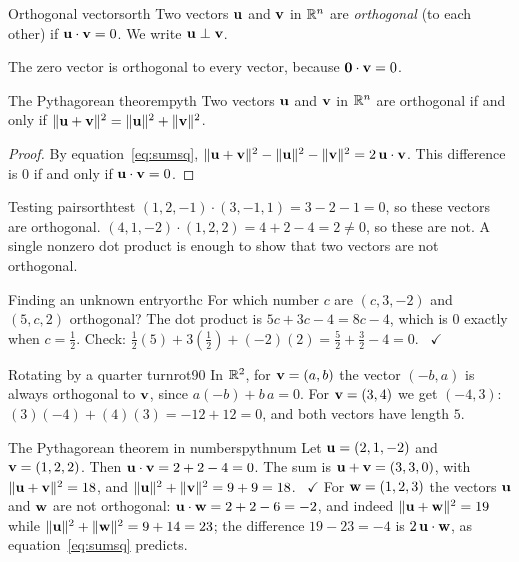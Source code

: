 \documentclass[11pt]{article}
\begin{document}
\begin{defn}{Orthogonal vectors}{orth}
Two vectors $\mathbf{u}$ and $\mathbf{v}$ in $\mathbb{R}^n$ are \emph{orthogonal} (to each other) if $\mathbf{u}\cdot\mathbf{v}=0$. We write $\mathbf{u}\perp\mathbf{v}$.
\end{defn}

The zero vector is orthogonal to every vector, because $\mathbf{0}\cdot\mathbf{v}=0$.

\begin{thm}{The Pythagorean theorem}{pyth}
Two vectors $\mathbf{u}$ and $\mathbf{v}$ in $\mathbb{R}^n$ are orthogonal if and only if $\lVert\mathbf{u}+\mathbf{v}\rVert^2=\lVert\mathbf{u}\rVert^2+\lVert\mathbf{v}\rVert^2$.
\end{thm}

\begin{proof}
By equation~\eqref{eq:sumsq}, $\lVert\mathbf{u}+\mathbf{v}\rVert^2-\lVert\mathbf{u}\rVert^2-\lVert\mathbf{v}\rVert^2=2\,\mathbf{u}\cdot\mathbf{v}$. This difference is $0$ if and only if $\mathbf{u}\cdot\mathbf{v}=0$.
\end{proof}

\begin{exmp}{Testing pairs}{orthtest}
$(1,2,-1)\cdot(3,-1,1)=3-2-1=0$, so these vectors are orthogonal. $(4,1,-2)\cdot(1,2,2)=4+2-4=2\neq0$, so these are not. A single nonzero dot product is enough to show that two vectors are not orthogonal.
\end{exmp}

\begin{exmp}{Finding an unknown entry}{orthc}
For which number $c$ are $(c,3,-2)$ and $(5,c,2)$ orthogonal? The dot product is $5c+3c-4=8c-4$, which is $0$ exactly when $c=\tfrac12$. Check: $\tfrac12(5)+3(\tfrac12)+(-2)(2)=\tfrac52+\tfrac32-4=0$. \ $\checkmark$
\end{exmp}

\begin{exmp}{Rotating by a quarter turn}{rot90}
In $\mathbb{R}^2$, for $\mathbf{v}=(a,b)$ the vector $(-b,a)$ is always orthogonal to $\mathbf{v}$, since $a(-b)+b\,a=0$. For $\mathbf{v}=(3,4)$ we get $(-4,3)$: $(3)(-4)+(4)(3)=-12+12=0$, and both vectors have length $5$.
\end{exmp}

\begin{exmp}{The Pythagorean theorem in numbers}{pythnum}
Let $\mathbf{u}=(2,1,-2)$ and $\mathbf{v}=(1,2,2)$. Then $\mathbf{u}\cdot\mathbf{v}=2+2-4=0$. The sum is $\mathbf{u}+\mathbf{v}=(3,3,0)$, with $\lVert\mathbf{u}+\mathbf{v}\rVert^2=18$, and $\lVert\mathbf{u}\rVert^2+\lVert\mathbf{v}\rVert^2=9+9=18$. \ $\checkmark$ For $\mathbf{w}=(1,2,3)$ the vectors $\mathbf{u}$ and $\mathbf{w}$ are not orthogonal: $\mathbf{u}\cdot\mathbf{w}=2+2-6=-2$, and indeed $\lVert\mathbf{u}+\mathbf{w}\rVert^2=19$ while $\lVert\mathbf{u}\rVert^2+\lVert\mathbf{w}\rVert^2=9+14=23$; the difference $19-23=-4$ is $2\,\mathbf{u}\cdot\mathbf{w}$, as equation~\eqref{eq:sumsq} predicts.
\end{exmp}
\end{document}
